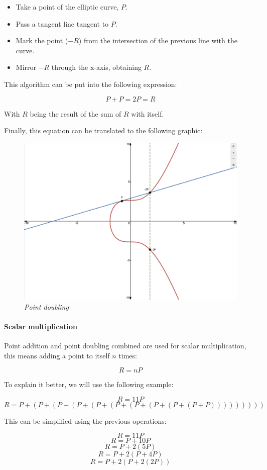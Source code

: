 \documentclass{article}
\newcommand\tab[1][1cm]{\hspace*{#1}}
\begin{document}
\begin{itemize}
    \item Take a point of the elliptic curve, \(P\).
    \item Pass a tangent line tangent to \(P\).
    \item Mark the point (\(-R\)) from the intersection of the previous line with the curve.
    \item Mirror \(-R\) through the x-axis, obtaining \(R\).
\end{itemize}

This algorithm can be put into the following expression:

\[P + P = 2P = R\]

With \(R\) being the result of the sum of \(R\) with itself.

Finally, this equation can be translated to the following graphic:

\begin{figure}[H]
    \begin{center}
        \includegraphics[width=0.5 \textwidth]{images/point_doubling.png}
        \caption{\textit{Point doubling}}
    \end{center}
\end{figure}

\paragraph{Scalar multiplication}

\tab Point addition and point doubling combined are used for scalar multiplication, this means adding a point to itself \(n\) times:

\[R = nP\]

To explain it better, we will use the following example:

\[R = 11P\]
\[R = P + (P + (P + (P + (P + (P + (P + (P + (P + (P + P)))))))))\]

This can be simplified using the previous operations:

\[R = 11P\]
\[R = P + 10P\]
\[R = P + 2(5P)\]
\[R = P + 2(P + 4P)\]
\[R = P + 2(P + 2(2P))\]
\end{document}
